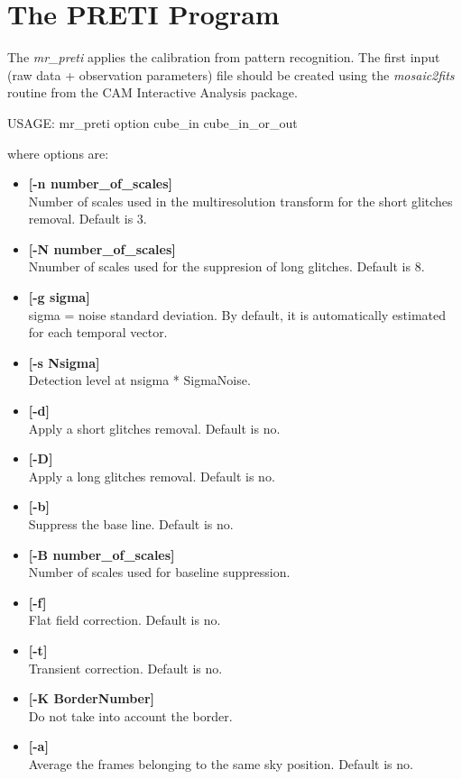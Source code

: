 \section*{The PRETI Program}
The {\em mr\_preti} applies the calibration from pattern recognition.
The first input (raw data + observation parameters) file should be created 
using the {\em mosaic2fits} routine from the CAM Interactive Analysis package.
\begin{center}
 USAGE: mr\_preti option cube\_in cube\_in\_or\_out
\end{center}
where options are:
\begin{itemize}
\item {\bf [-n number\_of\_scales]} \\
Number of scales used in the multiresolution transform for the short glitches
removal. 
Default is 3.
\item {\bf [-N number\_of\_scales]} \\
Nnumber of scales used for the suppresion of long glitches. 
Default is 8.
\item {\bf [-g sigma]} \\
sigma = noise standard deviation. By default, it is automatically
estimated for each temporal vector.
\item {\bf [-s Nsigma]} \\
Detection level at nsigma * SigmaNoise.
\item {\bf [-d]} \\
Apply a short  glitches removal.  Default is no.
\item {\bf [-D]} \\
Apply a long glitches removal. Default is no.
\item {\bf [-b]} \\
Suppress the base line. Default is no.
\item {\bf [-B number\_of\_scales]} \\
 Number of scales used for baseline suppression.
\item {\bf [-f]} \\
Flat field correction. Default is no.
\item {\bf [-t]} \\ 
 Transient correction. Default is no.
\item {\bf [-K BorderNumber]} \\
Do not take into account the border.
\item {\bf [-a]} \\
Average the frames belonging to the same sky position. Default is no.

\end{itemize}

